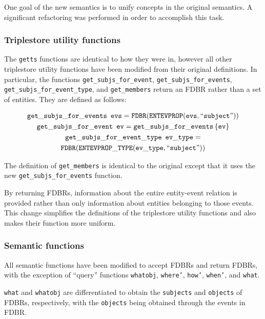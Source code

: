 \documentclass[../main.tex]{subfiles}
\begin{document}
One goal of the new semantics is to unify concepts in the original semantics.  A significant refactoring was performed in order to 
accomplish this task.

\subsubsection{Triplestore utility functions}

The \texttt{getts} functions are identical to how they were in\cite{frost2013event}, however
all other triplestore utility functions have been modified from their original definitions.
In particular, the functions \texttt{get\_subjs\_for\_event}, \texttt{get\_subjs\_for\_events},
\texttt{get\_subjs\_for\_event\_type}, and \texttt{get\_members} return an FDBR rather than a set of entities.  They are defined as follows:

\begin{multline*}
  \mathtt{get\_subjs\_for\_events}\enspace \mathtt{evs} = \mathtt{FDBR}(\mathtt{ENTEVPROP}(\mathtt{evs}, \text{``\texttt{subject}''})) \\
  \mathtt{get\_subjs\_for\_event}\enspace \mathtt{ev} = \mathtt{get\_subjs\_for\_events}\left\{\mathtt{ev}\right\} \\
  \mathtt{get\_subjs\_for\_event\_type}\enspace \mathtt{ev\_type} =\\ \mathtt{FDBR}(\mathtt{ENTEVPROP\_TYPE}(\mathtt{ev\_type}, \text{``\texttt{subject}''}))
\end{multline*}

The definition of \texttt{get\_members} is identical to the original except that it uses the new \texttt{get\_subjs\_for\_events} function.

By returning FDBRs, information about the entire entity-event relation is provided rather than only information about entities
belonging to those events.  This change simplifies the definitions of the triplestore utility functions and also makes their function
more uniform.


\subsubsection{Semantic functions}

All semantic functions have been modified to accept FDBRs and return FDBRs, with the exception of ``query'' functions
\texttt{whatobj}, \texttt{where'}, \texttt{how'}, \texttt{when'}, and \texttt{what}.

\texttt{what} and \texttt{whatobj} are differentiated to obtain the \texttt{subjects} and \texttt{objects} of FDBRs, respectively, with the
\texttt{objects} being obtained through the events in FDBR. 
\end{document}
